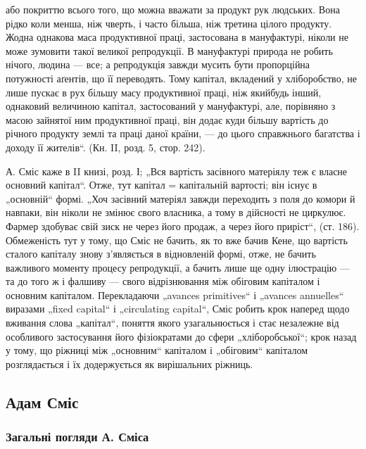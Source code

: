 \parcont{}  %
або покриттю всього того, що можна вважати за продукт рук людських.
Вона рідко коли менша, ніж чверть, і часто більша, ніж третина цілого
продукту. Жодна однакова маса продуктивної праці, застосована в мануфактурі,
ніколи не може зумовити такої великої репродукції. В мануфактурі
природа не робить нічого, людина — все; а репродукція завжди
мусить бути пропорційна потужності аґентів, що її переводять. Тому
капітал, вкладений у хліборобство, не лише пускає в рух більшу масу
продуктивної праці, ніж якийбудь інший, однаковий величиною капітал,
застосований у мануфактурі, але, порівняно з масою зайнятої ним продуктивної
праці, він додає куди більшу вартість до річного продукту
землі та праці даної країни, — до цього справжнього багатства і доходу
її жителів“. (Кн. II, розд. 5, стор. 242).

А. Сміс каже в II книзі, розд. І; „Вся вартість засівного матеріялу
теж є власне основний капітал“. Отже, тут капітал = капітальній вартості;
він існує в „основній“ формі. „Хоч засівний матеріял завжди переходить
з поля до комори й навпаки, він ніколи не змінює свого власника, а тому
в дійсності не циркулює. Фармер здобуває свій зиск не через його продаж,
а через його приріст“, (ст. 186). Обмеженість тут у тому, що Сміс
не бачить, як то вже бачив Кене, що вартість сталого капіталу знову
з’являється в відновленій формі, отже, не бачить важливого моменту
процесу репродукції, а бачить лише ще одну ілюстрацію — та до того ж
і фалшиву — свого відрізнювання між обіговим капіталом і основним
капіталом. Перекладаючи „avances primitives“ і „avances annuelles“
виразами „fixed capital“ і „circulating capital“, Сміс робить крок наперед
щодо вживання слова „капітал“, поняття якого узагальнюється і стає
незалежне від особливого застосування його фізіократами до сфери
„хліборобської“; крок назад у тому, що ріжниці між „основним“ капіталом
і „обіговим“ капіталом розглядається і їх додержується як вирішальних
ріжниць.

\subsection{Адам Сміс}

\subsubsection{Загальні погляди А. Сміса}

